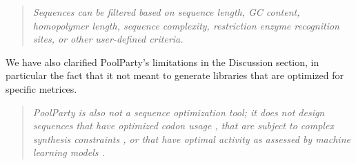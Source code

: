 \documentclass[11pt]{article}
\newenvironment{response}{\par\color{responseblue}}{\par}
\newenvironment{msquote}
  {\begin{quote}\color{responseblue}\itshape\noindent\ignorespaces}
  {\end{quote}}
\begin{document}
\begin{enumerate}
\begin{response}
\begin{msquote}
Sequences can be filtered based on sequence length, GC content, homopolymer
length, sequence complexity, restriction enzyme recognition sites, or other
user-defined criteria.
\end{msquote}

We have also clarified PoolParty's limitations in the Discussion section, in particular the fact that it not meant to generate libraries that are optimized for specific metrices.

\begin{msquote}
PoolParty is also not a sequence optimization tool; it does not design sequences that have optimized codon usage \citep{Swainston2017rb}, that are subject to complex synthesis constraints \citep{Zulkower2020jk}, or that have optimal activity as assessed by machine learning models \citep{Schreiber2025ledidi}.
\end{msquote}
\end{response}





\end{enumerate}
\end{document}

